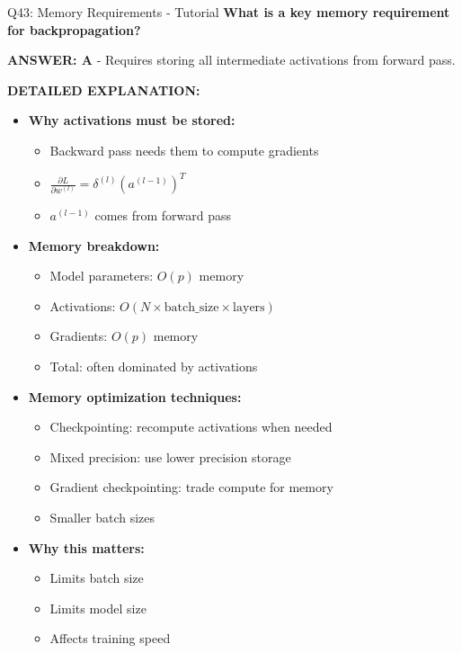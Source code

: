 \documentclass[8pt]{beamer}
\begin{document}
	\begin{frame}{Q43: Memory Requirements - Tutorial}
		\fontsize{6.5}{7.5}\selectfont
		\textbf{What is a key memory requirement for backpropagation?}
		
		\vspace{0.05cm}
		\textcolor{myblue}{\textbf{ANSWER: A}} - Requires storing all intermediate activations from forward pass.
		
		\vspace{0.05cm}
		\textbf{DETAILED EXPLANATION:}
		\begin{itemize}
			\item \textbf{Why activations must be stored:}
			\begin{itemize}
				\item Backward pass needs them to compute gradients
				\item $\frac{\partial L}{\partial w^{(l)}} = \delta^{(l)} (a^{(l-1)})^T$
				\item $a^{(l-1)}$ comes from forward pass
			\end{itemize}
			\item \textbf{Memory breakdown:}
			\begin{itemize}
				\item Model parameters: $O(p)$ memory
				\item Activations: $O(N \times \text{batch\_size} \times \text{layers})$
				\item Gradients: $O(p)$ memory
				\item Total: often dominated by activations
			\end{itemize}
			\item \textbf{Memory optimization techniques:}
			\begin{itemize}
				\item Checkpointing: recompute activations when needed
				\item Mixed precision: use lower precision storage
				\item Gradient checkpointing: trade compute for memory
				\item Smaller batch sizes
			\end{itemize}
			\item \textbf{Why this matters:}
			\begin{itemize}
				\item Limits batch size
				\item Limits model size
				\item Affects training speed
			\end{itemize}
		\end{itemize}
		

\end{frame}
\end{document}
